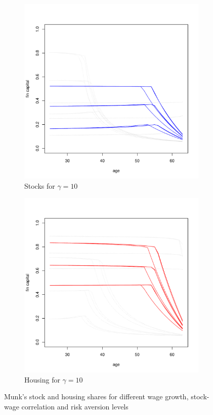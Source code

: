 \documentclass[]{elsarticle}
\begin{document}
\begin{figure}[H]\ContinuedFloat
    \begin{subfigure}{0.45\textwidth}
		\centering
		\includegraphics[scale=0.3]{figs/smunkhouse10.pdf}
		\caption{Stocks for $\gamma = 10$}
	\end{subfigure}
	\hfill
    \begin{subfigure}{0.45\textwidth}
		\centering
		\includegraphics[scale=0.3]{figs/hmunkhouse10.pdf}
		\caption{Housing for $\gamma = 10$}
	\end{subfigure}
	\caption{Munk's stock and housing shares for different wage growth, stock-wage correlation and risk aversion levels}
	\label{fig:munkh}
\end{figure}
\end{document}
